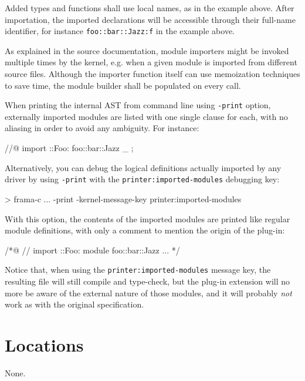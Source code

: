 Added types and functions shall use local names, as in the example above.
After importation, the imported declarations will be accessible through
their full-name identifier, for instance \verb+foo::bar::Jazz:f+
in the example above.

As explained in the \framac source documentation, module importers might be
invoked multiple times by the kernel, e.g. when a given module is imported from
different source files. Although the importer function itself can use
memoization techniques to save time, the module builder shall be populated on
every call.

When printing the internal AST from \framac command line using \verb+-print+
option, externally imported modules are listed with one single clause for each,
with no aliasing in order to avoid any ambiguity. For instance:
\begin{ccode}
//@ import \myplugin::Foo: foo::bar::Jazz \as _ ;
\end{ccode}

Alternatively, you can debug the logical definitions actually imported by any
driver by using \verb+-print+ with the \verb+printer:imported-modules+ debugging
key:
\begin{frama-c-commands}
> frama-c ... -print -kernel-message-key printer:imported-modules
\end{frama-c-commands}

With this option, the contents of the imported modules are printed like regular
module definitions, with only a comment to mention the origin of the plug-in:
\begin{ccode}
/*@ // import \myplugin::Foo:
    module foo::bar::Jazz {
        ...
    }
  */
\end{ccode}

Notice that, when using the \verb+printer:imported-modules+ message key, the
resulting file will still compile and type-check, but the plug-in extension will
no more be aware of the external nature of those modules, and it will probably
\emph{not} work as with the original specification.


\section{Locations}\label{adv:memory}

\begin{prereq}
  None.
\end{prereq}

